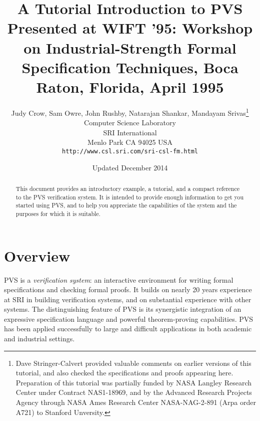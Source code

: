 \documentclass[11pt]{article}
\title{{\Huge\bf A Tutorial Introduction to PVS}\\\vspace*{20mm}
\smaller  Presented at WIFT '95: Workshop on Industrial-Strength Formal
Specification Techniques, Boca Raton, Florida, April 1995}
\author{Judy Crow, Sam Owre, John Rushby, Natarajan Shankar, Mandayam
Srivas\thanks{Dave Stringer-Calvert provided valuable comments on
earlier versions of this tutorial, and also checked the specifications
and proofs appearing here.   Preparation of this tutorial was
partially funded by NASA Langley Research Center under Contract
NAS1-18969, and by the Advanced Research Projects Agency through NASA
Ames Research Center NASA-NAG-2-891 (Arpa order A721) to
Stanford Unversity.}\\
Computer Science Laboratory\\
SRI International\\
Menlo Park CA 94025 USA\\[1ex]
\texttt{http://www.csl.sri.com/sri-csl-fm.html}
}
\date{Updated December 2014}
\begin{document}
 
\maketitle
\begin{abstract}
This document provides an introductory example, a tutorial, and a
compact reference to the PVS verification system.  It is intended to
provide enough information to get you started using PVS, and to help
you appreciate the capabilities of the system and the purposes for
which it is suitable.


\end{abstract}
\thispagestyle{empty}
\newpage
\evensidemargin 0.0in
\mbox{}
\thispagestyle{empty}
\newpage

\setcounter{page}{1} 


\tableofcontents
\cleardoublepage

\setcounter{page}{0} 

\section*{Overview}

PVS is a {\em verification system\/}:  an interactive environment for
writing formal specifications and checking formal proofs.  It builds on
nearly 20 years experience at SRI in building verification systems, and on
substantial experience with other systems.  The distinguishing feature of
PVS is its synergistic integration of an expressive specification
language and powerful theorem-proving capabilities.  PVS has been
applied successfully to large and difficult applications in both
academic and industrial settings.
\end{document}
